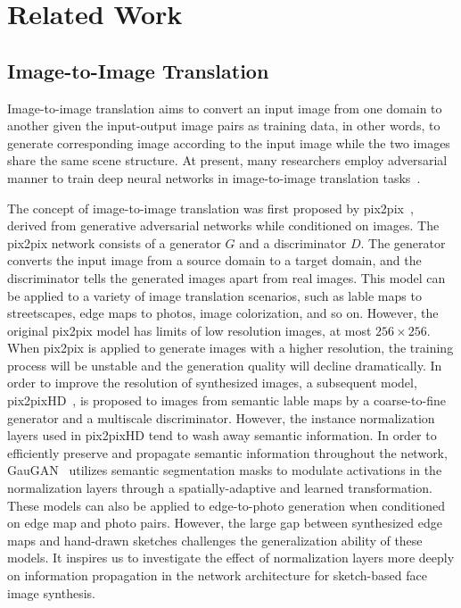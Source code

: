 \documentclass[10pt,twocolumn,letterpaper]{article}
\begin{document}
\section{Related Work}
\subsection{Image-to-Image Translation}
Image-to-image translation aims to convert an input image from one domain to another given the input-output image pairs as training data, in other words, to generate corresponding image according to the input image while the two images share the same scene structure. At present, many researchers employ adversarial manner to train deep neural networks in image-to-image translation tasks~\cite{cyclegan,bicyclegan,spagan,munit,crn,cfgan,sis,cfgan,maskgan}.

The concept of image-to-image translation was first proposed by pix2pix~\cite{pix2pix}, derived from generative adversarial networks while conditioned on images. 
The pix2pix network consists of a generator $G$ and a discriminator $D$. The generator converts the input image from a source domain to a target domain, and the discriminator tells the generated images apart from real images. 
This model can be applied to a variety of image translation scenarios, such as lable maps to streetscapes, edge maps to photos, image colorization, and so on.
However, the original pix2pix model has limits of low resolution images, at most $256 \times 256$. 
When pix2pix is applied to generate images with a higher resolution, the training process will be unstable and the generation quality will decline dramatically.
In order to improve the resolution of synthesized images, a subsequent model, pix2pixHD~\cite{pix2pixhd}, is proposed to images from semantic lable maps by a coarse-to-fine generator and a multiscale discriminator. 
However, the instance normalization layers used in pix2pixHD tend to wash away semantic information.
In order to efficiently preserve and propagate semantic information throughout the network, GauGAN~\cite{spade} utilizes semantic segmentation masks to modulate activations in the normalization layers through a spatially-adaptive and learned transformation. 
%
These models can also be applied to edge-to-photo generation when conditioned on edge map and photo pairs. 
However, the large gap between synthesized edge maps and hand-drawn sketches challenges the generalization ability of these models.
%
It inspires us to investigate the effect of normalization layers more deeply on information propagation in the network architecture for sketch-based face image synthesis.
\end{document}
